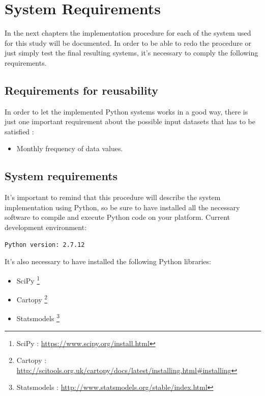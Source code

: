 





\section{System Requirements}
In the next chapters the implementation procedure for each of the system used for this study will be documented. In order to be able to redo the procedure or just simply test the final resulting systems, it's necessary to comply the following requirements. 
\vspace{-5mm}
\subsection{Requirements for reusability}
\vspace{-5mm}
In order to let the implemented Python systems works in a good way, there is just one important requirement about the possible input datasets that has to be satisfied :
\vspace{-5mm}
\begin{itemize}
\item Monthly frequency of data values.
\end{itemize}
\vspace{-5mm}
\subsection{System requirements}
\vspace{-5mm}
It's important to remind that this procedure will describe the system implementation using Python, so be sure to have installed all the necessary software to compile and execute Python code on your platform. Current development environment:
\begin{lstlisting}
Python version: 2.7.12
\end{lstlisting}

It's also necessary to have installed the following Python libraries:
\vspace{-5mm}
\begin{itemize}
\setlength{\itemsep}{-5pt}
\item  SciPy \footnote{SciPy : \url{https://www.scipy.org/install.html}}
\item Cartopy \footnote{Cartopy : \url{http://scitools.org.uk/cartopy/docs/latest/installing.html\#installing}}
\item Statsmodels \footnote{Statsmodels : \url{http://www.statsmodels.org/stable/index.html}}
\end{itemize}
\vspace{+5mm}


